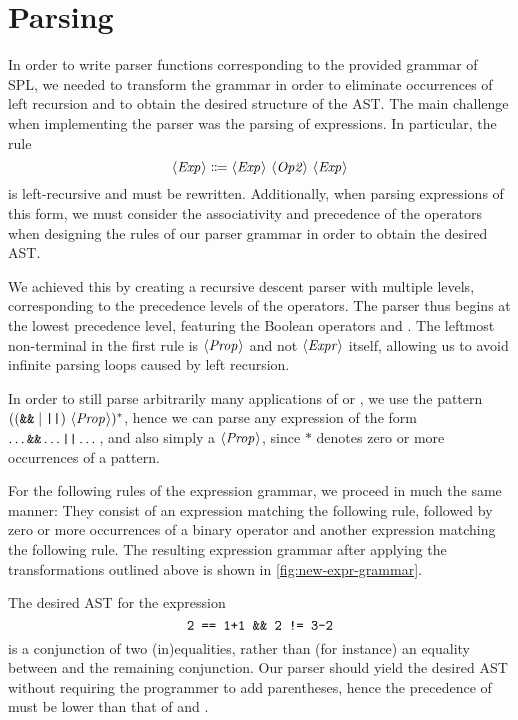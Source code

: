 \section{Parsing}
In order to write parser functions corresponding to the provided grammar of SPL,
we needed to transform the grammar in order to eliminate occurrences of left
recursion and to obtain the desired structure of the AST.
The main challenge when implementing the parser was the parsing of expressions.
In particular, the rule
\[ \NT{Exp} \Coloneqq \NT{Exp}\ \NT{Op2}\ \NT{Exp} \]
is left-recursive and must be rewritten.
Additionally, when parsing expressions of this form, we must consider the
associativity and precedence of the operators when designing the rules of our
parser grammar in order to obtain the desired AST.

We achieved this by creating a recursive descent parser with multiple levels,
corresponding to the precedence levels of the operators.
The parser thus begins at the lowest precedence level, featuring the Boolean
operators \code{\&\&} and \code{||}.
The leftmost non-terminal in the first rule is $\langle \textit{Prop}\kern.7pt \rangle$ and not $\langle \textit{Expr}\kern.7pt \rangle$
itself, allowing us to avoid infinite parsing loops caused by left recursion.

In order to still parse arbitrarily many applications of \code{\&\&} or
\code{||}, we use the pattern $((\texttt{\&\&} \mid \texttt{||})\ \langle \textit{Prop}\kern.7pt \rangle)^*$,
hence we can parse any expression of the form $\dots \texttt{\&\&} \dots \texttt{||} \dots$,
and also simply a $\langle \textit{Prop}\kern.7pt \rangle$, since $*$ denotes zero or more occurrences of
a pattern.

For the following rules of the expression grammar, we proceed in much the same
manner: They consist of an expression matching the following rule, followed
by zero or more occurrences of a binary operator and another expression matching
the following rule. The resulting expression grammar after applying the
transformations outlined above is shown in \cref{fig:new-expr-grammar}.

The desired AST for the expression
\[ \texttt{2 == 1+1 \&\& 2 != 3-2} \]
is a conjunction of two (in)equalities, rather than (for instance) an equality
between  and the remaining conjunction.
Our parser should yield the desired AST without requiring the programmer to add
parentheses, hence the precedence of \code{\&\&} must be lower than that of
\code{==} and \code{!=}.

